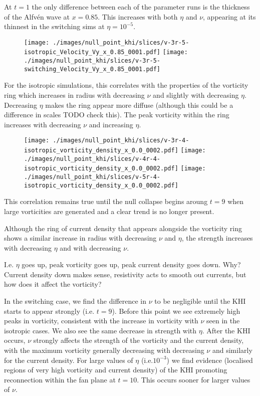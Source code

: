 At $t=1$ the only difference between each of the parameter runs is the thickness of the Alfv\'en wave at $x=0.85$. This increases with both $\eta$ and $\nu$, appearing at its thinnest in the switching sims at $\eta=10^{-5}$.

\begin{figure}[H]
  \centering
  \texttt{[image: ./images/null\_point\_khi/slices/v-3r-5-isotropic\_Velocity\_Vy\_x\_0.85\_0001.pdf]}
  \texttt{[image: ./images/null\_point\_khi/slices/v-3r-5-switching\_Velocity\_Vy\_x\_0.85\_0001.pdf]}
\end{figure}

For the isotropic simulations, this correlates with the properties of the vorticity ring which increases in radius with decreasing $\nu$ and slightly with decreasing $\eta$. Decreasing $\eta$ makes the ring appear more diffuse (although this could be a difference in scales TODO check this). The peak vorticity within the ring increases with decreasing $\nu$ and increasing $\eta$.

\begin{figure}[H]
  \centering
  \texttt{[image: ./images/null\_point\_khi/slices/v-3r-4-isotropic\_vorticity\_density\_x\_0.0\_0002.pdf]}
  \texttt{[image: ./images/null\_point\_khi/slices/v-4r-4-isotropic\_vorticity\_density\_x\_0.0\_0002.pdf]}
  \texttt{[image: ./images/null\_point\_khi/slices/v-5r-4-isotropic\_vorticity\_density\_x\_0.0\_0002.pdf]}
\end{figure}

This correlation remains true until the null collapse begins aroung $t=9$ when large vorticities are generated and a clear trend is no longer present.

Although the ring of current density that appears alongside the vorticity ring shows a similar increase in radius with decreasing $\nu$ and $\eta$, the strength increases with decreasing $\eta$ and with decreasing $\nu$.

I.e. $\eta$ goes up, peak vorticity goes up, peak current density goes down. Why? Current density down makes sense, resistivity acts to smooth out currents, but how does it affect the vorticity?

In the switching case, we find the difference in $\nu$ to be negligible until the KHI starts to appear strongly (i.e. $t=9$). Before this point we see extremely high peaks in vorticity, consistent with the increase in vorticity with $\nu$ seen in the isotropic cases. We also see the same decrease in strength with $\eta$. After the KHI occurs, $\nu$ strongly affects the strength of the vorticity and the current density, with the maximum vorticity generally decreasing with decreasing $\nu$ and similarly for the current density. For large values of $\eta$ (i.e.$10^{-3}$) we find evidence (localised regions of very high vorticity and current density) of the KHI promoting reconnection within the fan plane at $t=10$. This occurs sooner for larger values of $\nu$.

